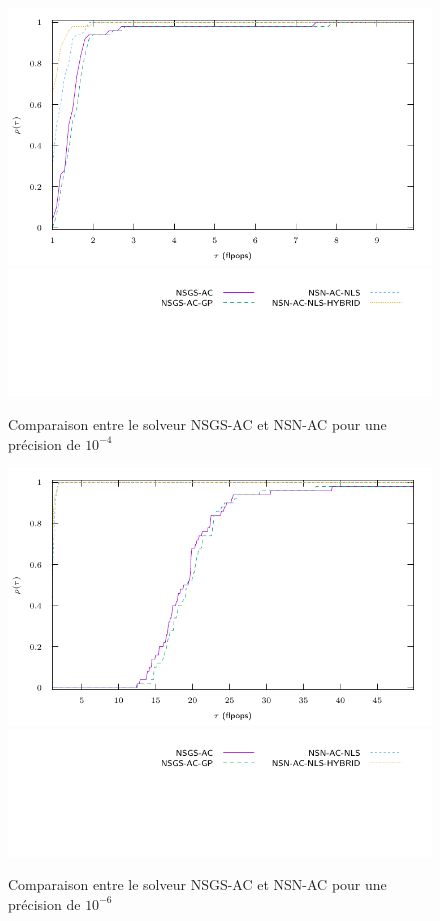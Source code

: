 \documentclass{CSMA2017}
\begin{document}
\begin{figure}
  \centering
  \includegraphics{figure/LowWall_FEM.1e-4.with_guess/simple/profile-LMGC_LowWall_FEM.pdf}
  \includegraphics{figure/LowWall_FEM.1e-4.with_guess/simple/profile-LMGC_LowWall_FEM_legend.pdf}
  \caption{Comparaison entre le solveur NSGS-AC et NSN-AC pour une précision de $10^{-4}$}
  \label{fig:LowWall_FEM.1e-4.simple}
\end{figure}
\begin{figure}
  \centering
  \includegraphics{figure/LowWall_FEM.1e-6.with_guess/simple/profile-LMGC_LowWall_FEM.pdf}
  \includegraphics{figure/LowWall_FEM.1e-6.with_guess/simple/profile-LMGC_LowWall_FEM_legend.pdf}
  \caption{Comparaison entre le solveur NSGS-AC et NSN-AC pour une précision de $10^{-6}$}
  \label{fig:LowWall_FEM.1e-6.simple}
\end{figure}
\end{document}
